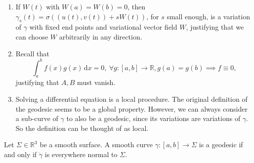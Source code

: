 \documentclass[a4paper]{article}
\begin{document}
\begin{remark}
	\begin{enumerate}[(1)]
		\item If $W(t)$ with $W(a)=W(b)=0$, then $ \gamma_s(t) = \sigma((u(t),v(t))+sW(t)) $, for $s$ small enough, is a variation of $\gamma$ with fixed end points and variational vector field $W$, justifying that we can choose $W$ arbitrarily in any direction.
		\item Recall that 
		\[
			\int_{a}^{b} f(x)g(x) \,\mathrm{d}x = 0,\ \forall g:[a,b]\to \mathbb{R}, g(a)=g(b) \implies f\equiv 0, 
		\]
		justifying that $A,B$ must vanish. 
		\item Solving a differential equation is a local procedure.
		The original definition of the geodesic seems to be a global property.
		However, we can always consider a sub-curve of \( \gamma \) to also be a geodesic, since its variations are variations of \( \gamma \).
		So the definition can be thought of as local.
	\end{enumerate}
\end{remark}

\begin{proposition}
	Let $ \Sigma\in \mathbb{R}^{3} $ be a smooth surface. A smooth curve $ \gamma:[a,b]\to \Sigma $ is a geodesic if and only if $ \ddot{\gamma} $ is everywhere normal to $ \Sigma $.
\end{proposition}
\end{document}
